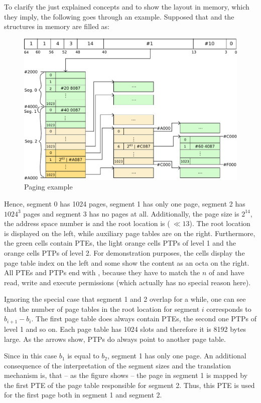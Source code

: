 To clarify the just explained concepts and to show the layout in memory, which they imply, the following goes through an example. Supposed that  and the  structures in memory are filled as:
\begin{figure}[H]
	\centering
	\includegraphics[width=\textwidth]{img/paging-example-crop.pdf}
	\caption{Paging example}
\end{figure}
\noindent Hence, segment 0 has 1024 pages, segment 1 has only one page, segment 2 has $1024^3$ pages and segment 3 has no pages at all. Additionally, the page size is $2^{14}$, the address space number is  and the root location is  ($~\ll 13$). The root location is displayed on the left, while auxiliary page tables are on the right. Furthermore, the green cells contain PTEs, the light orange cells PTPs of level 1 and the orange cells PTPs of level 2. For demonstration purposes, the cells display the page table index on the left and some show the content as an octa on the right. All PTEs and PTPs end with , because they have to match the $n$ of  and have read, write and execute permissions (which actually has no special reason here).

Ignoring the special case that segment 1 and 2 overlap for a while, one can see that the number of page tables in the root location for segment $i$ corresponds to $b_{i+1} - b_i$. The first page table does always contain PTEs, the second one PTPs of level 1 and so on. Each page table has 1024 slots and therefore it is 8192 bytes large. As the arrows show, PTPs do always point to another page table.

Since in this case $b_1$ is equal to $b_2$, segment 1 has only one page. An additional consequence of the interpretation of the segment sizes and the translation mechanism is, that -- as the figure shows -- the page in segment 1 is mapped by the first PTE of the page table responsible for segment 2. Thus, this PTE is used for the first page both in segment 1 and segment 2.

